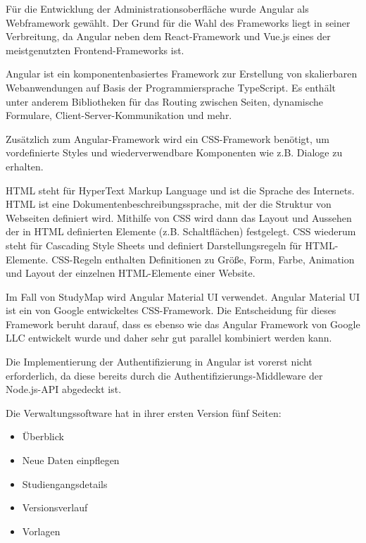 Für die Entwicklung der Administrationsoberfläche wurde Angular als Webframework gewählt. Der Grund für die Wahl des Frameworks liegt in seiner Verbreitung, da Angular neben dem React-Framework und Vue.js eines der meistgenutzten Frontend-Frameworks ist. \parencite{greif_state_2022}

Angular ist ein komponentenbasiertes Framework zur Erstellung von skalierbaren Webanwendungen auf Basis der Programmiersprache TypeScript. Es enthält unter anderem Bibliotheken für das Routing zwischen Seiten, dynamische Formulare, Client-Server-Kommunikation und mehr. \parencite{google_inc_angular_2023} 

Zusätzlich zum Angular-Framework wird ein CSS-Framework benötigt, um vordefinierte Styles und wiederverwendbare Komponenten wie z.B. Dialoge zu erhalten.

HTML steht für HyperText Markup Language und ist die Sprache des Internets. HTML ist eine Dokumentenbeschreibungssprache, mit der die Struktur von Webseiten definiert wird. Mithilfe von CSS wird dann das Layout und Aussehen der in HTML definierten Elemente (z.B. Schaltflächen) festgelegt. \parencite{mozilla_corporation_html_2023} CSS wiederum steht für Cascading Style Sheets und definiert Darstellungsregeln für HTML-Elemente. CSS-Regeln enthalten Definitionen zu Größe, Form, Farbe, Animation und Layout der einzelnen HTML-Elemente einer Website. \parencite{mozilla_corporation_what_2024}

Im Fall von StudyMap wird Angular Material UI verwendet. Angular Material UI ist ein von Google entwickeltes CSS-Framework. Die Entscheidung für dieses Framework beruht darauf, dass es ebenso wie das Angular Framework von Google LLC entwickelt wurde und daher sehr gut parallel kombiniert werden kann. \parencite{google_llc_angular_2024}

Die Implementierung der Authentifizierung in Angular ist vorerst nicht erforderlich, da diese bereits durch die Authentifizierungs-Middleware der Node.js-API abgedeckt ist.

\noindent
Die Verwaltungssoftware hat in ihrer ersten Version fünf Seiten:
\begin{itemize}
    \item Überblick
    \item Neue Daten einpflegen
    \item Studiengangsdetails
    \item Versionsverlauf
    \item Vorlagen
\end{itemize}

